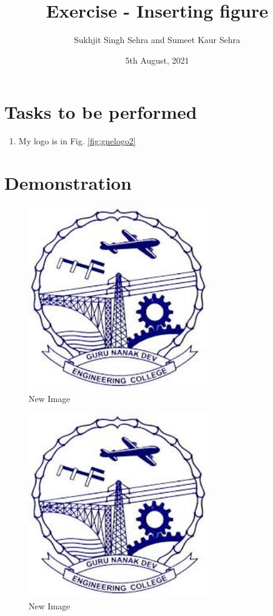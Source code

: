 \documentclass{report}
\title{Exercise - Inserting figure}
\author{Sukhjit Singh Sehra and Sumeet Kaur Sehra}
\date{5th August, 2021}
\begin{document}
\maketitle	
\listoffigures
\section*{Tasks to be performed}
\begin{enumerate}	
\item My logo is in Fig. \ref{fig:gnelogo2}
\end{enumerate}
\section*{Demonstration}
\begin{figure}
\centering
\includegraphics[width=0.7\textwidth]{../../images/gnelogo}
\caption{New Image}

\label{fig:gnelogo}
\end{figure}
\begin{figure}
\centering
\includegraphics[width=0.7\textwidth]{../../images/gnelogo}
\caption{New Image}
\label{fig:gnelogo1}
\end{figure}
\end{document}
